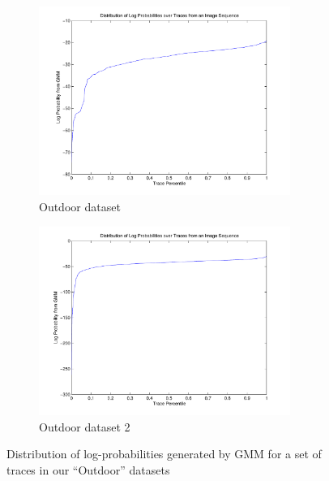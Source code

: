 \begin{figure}[h]
	\begin{subfigure}[b]{0.5\textwidth}
		\centering
		\includegraphics[width=0.9\textwidth]{figs/logpdfs-frame90.pdf}
		\caption{Outdoor dataset}
		\label{fig:logpdfs:90}
	\end{subfigure}%
	\begin{subfigure}[b]{0.5\textwidth}
		\centering
		\includegraphics[width=0.9\textwidth]{figs/logpdfs.pdf}
		\caption{Outdoor dataset 2}
		\label{fig:logpdfs:105}
	\end{subfigure}%

	\caption{Distribution of log-probabilities generated by GMM for a set of traces in our ``Outdoor'' datasets}
	\label{fig:logpdfs}
\end{figure}

